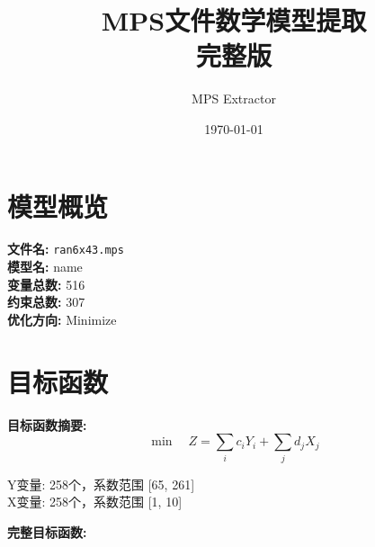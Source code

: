 \documentclass[a4paper,10pt]{article}
\title{MPS文件数学模型提取\\{\large 完整版}}
\author{MPS Extractor}
\date{\today}
\begin{document}
\maketitle
\tableofcontents
\newpage

\section{模型概览}

\textbf{文件名:} \texttt{ran6x43.mps} \\
\textbf{模型名:} name \\
\textbf{变量总数:} 516 \\
\textbf{约束总数:} 307 \\
\textbf{优化方向:} Minimize \\

\section{目标函数}

\textbf{目标函数摘要:}
\begin{equation}
\min \quad Z = \sum_{i} c_i Y_i + \sum_{j} d_j X_j
\end{equation}

Y变量: 258个，系数范围 [65, 261] \\
X变量: 258个，系数范围 [1, 10]

\textbf{完整目标函数:}
\end{document}
